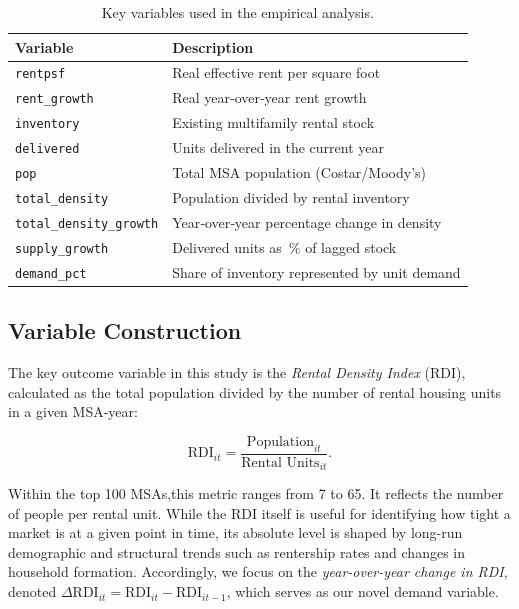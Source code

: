 \documentclass[APA,Times1COL]{WileyNJDv5} %
\begin{document}
\begin{table}[t]%
\centering
\caption{Key variables used in the empirical analysis.\label{tab:variables}}%
\begin{tabular*}{\textwidth}{@{\extracolsep\fill}ll@{\extracolsep\fill}}%
\toprule
\textbf{Variable} & \textbf{Description} \\
\midrule
\texttt{rentpsf}               & Real effective rent per square foot \\
\texttt{rent\_growth}          & Real year‐over‐year rent growth \\
\texttt{inventory}             & Existing multifamily rental stock \\
\texttt{delivered}             & Units delivered in the current year \\
\texttt{pop}                   & Total MSA population (Costar/Moody’s) \\
\texttt{total\_density}        & Population divided by rental inventory \\
\texttt{total\_density\_growth}& Year‐over‐year percentage change in density \\
\texttt{supply\_growth}        & Delivered units as \% of lagged stock \\
\texttt{demand\_pct}           & Share of inventory represented by unit demand \\
\bottomrule
\end{tabular*}
\end{table}

\subsection{Variable Construction}
The key outcome variable in this study is the \textit{Rental Density Index} (RDI), calculated as the total population divided by the number of rental housing units in a given MSA-year:

\begin{equation*}
	\text{RDI}_{it} = \frac{\text{Population}_{it}}{\text{Rental Units}_{it}}.
\end{equation*}
	

Within the top 100 MSAs,this metric ranges from 7 to 65. It reflects the number of people per rental unit. While the RDI itself is useful for identifying how tight a market is at a given point in time, its absolute level is shaped by long-run demographic and structural trends such as rentership rates and changes in household formation. Accordingly, we focus on the \textit{year-over-year change in RDI}, denoted \( \Delta \text{RDI}_{it} = \text{RDI}_{it} - \text{RDI}_{it-1} \), which serves as our novel demand variable.
\end{document}
